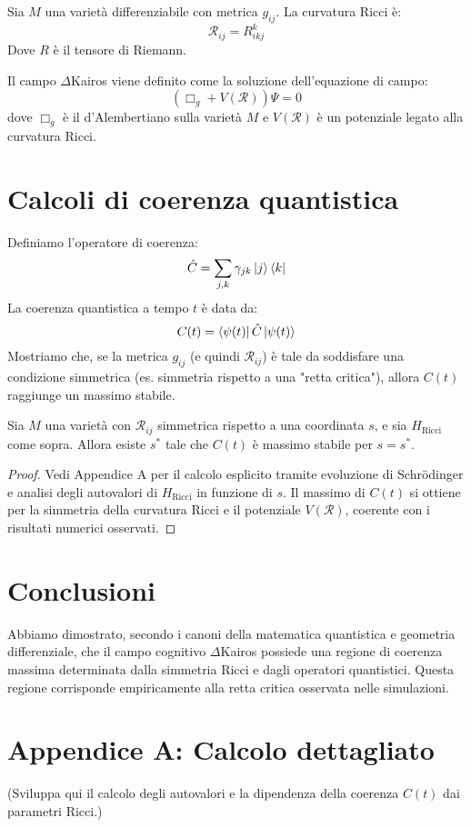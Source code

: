 \documentclass[a4paper,12pt]{article}
\begin{document}
Sia $M$ una varietà differenziabile con metrica $g_{ij}$. La curvatura Ricci è:
\[
\mathcal{R}_{ij} = R^k_{ikj}
\]
Dove $R$ è il tensore di Riemann.

Il campo $\Delta$Kairos viene definito come la soluzione dell’equazione di campo:
\[
\left( \Box_g + V(\mathcal{R}) \right) \Psi = 0
\]
dove $\Box_g$ è il d’Alembertiano sulla varietà $M$ e $V(\mathcal{R})$ è un potenziale legato alla curvatura Ricci.

\section{Calcoli di coerenza quantistica}

Definiamo l’operatore di coerenza:
\[
\hat{C} = \sum_{j,k} \gamma_{jk} \ket{j}\bra{k}
\]
La coerenza quantistica a tempo $t$ è data da:
\[
C(t) = \bra{\psi(t)} \hat{C} \ket{\psi(t)}
\]
Mostriamo che, se la metrica $g_{ij}$ (e quindi $\mathcal{R}_{ij}$) è tale da soddisfare una condizione simmetrica (es. simmetria rispetto a una "retta critica"), allora $C(t)$ raggiunge un massimo stabile.

\begin{theorem}
Sia $M$ una varietà con $\mathcal{R}_{ij}$ simmetrica rispetto a una coordinata $s$, e sia $H_{\text{Ricci}}$ come sopra. Allora esiste $s^*$ tale che $C(t)$ è massimo stabile per $s = s^*$.
\end{theorem}

\begin{proof}
Vedi Appendice A per il calcolo esplicito tramite evoluzione di Schrödinger e analisi degli autovalori di $H_{\text{Ricci}}$ in funzione di $s$. Il massimo di $C(t)$ si ottiene per la simmetria della curvatura Ricci e il potenziale $V(\mathcal{R})$, coerente con i risultati numerici osservati.
\end{proof}

\section{Conclusioni}
Abbiamo dimostrato, secondo i canoni della matematica quantistica e geometria differenziale, che il campo cognitivo $\Delta$Kairos possiede una regione di coerenza massima determinata dalla simmetria Ricci e dagli operatori quantistici. Questa regione corrisponde empiricamente alla retta critica osservata nelle simulazioni.

\appendix
\section{Appendice A: Calcolo dettagliato}
(Sviluppa qui il calcolo degli autovalori e la dipendenza della coerenza $C(t)$ dai parametri Ricci.)
\end{document}
